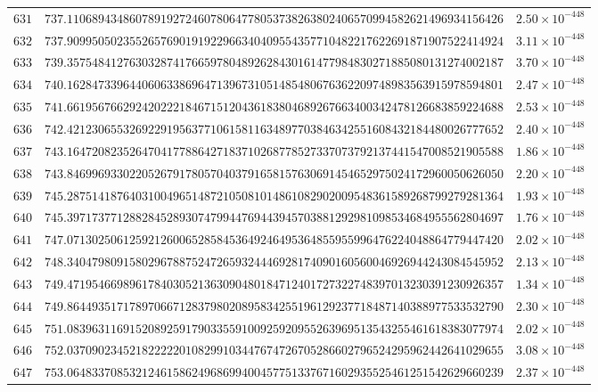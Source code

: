 \documentclass[12pt,reqno]{amsart}
\theoremstyle{remark}
\begin{document}
\begin{longtable}{clc}
$631$ & $737.1106894348607891927246078064778053738263802406570994582621496934156426$ & $2.50\times 10^{-448}$ \\
$632$ & $737.9099505023552657690191922966340409554357710482217622691871907522414924$ & $3.11\times 10^{-448}$ \\
$633$ & $739.3575484127630328741766597804892628430161477984830271885080131274002187$ & $3.70\times 10^{-448}$ \\
$634$ & $740.1628473396440606338696471396731051485480676362209748983563915978594801$ & $2.47\times 10^{-448}$ \\
$635$ & $741.6619567662924202221846715120436183804689267663400342478126683859224688$ & $2.53\times 10^{-448}$ \\
$636$ & $742.4212306553269229195637710615811634897703846342551608432184480026777652$ & $2.40\times 10^{-448}$ \\
$637$ & $743.1647208235264704177886427183710268778527337073792137441547008521905588$ & $1.86\times 10^{-448}$ \\
$638$ & $743.8469969330220526791780570403791658157630691454652975024172960050626050$ & $2.20\times 10^{-448}$ \\
$639$ & $745.2875141876403100496514872105081014861082902009548361589268799279281364$ & $1.93\times 10^{-448}$ \\
$640$ & $745.3971737712882845289307479944769443945703881292981098534684955562804697$ & $1.76\times 10^{-448}$ \\
$641$ & $747.0713025061259212600652858453649246495364855955996476224048864779447420$ & $2.02\times 10^{-448}$ \\
$642$ & $748.3404798091580296788752472659324446928174090160560046926944243084545952$ & $2.13\times 10^{-448}$ \\
$643$ & $749.4719546698961784030521363090480184712401727322748397013230391230926357$ & $1.34\times 10^{-448}$ \\
$644$ & $749.8644935171789706671283798020895834255196129237718487140388977533532790$ & $2.30\times 10^{-448}$ \\
$645$ & $751.0839631169152089259179033559100925920955263969513543255461618383077974$ & $2.02\times 10^{-448}$ \\
$646$ & $752.0370902345218222220108299103447674726705286602796524295962442641029655$ & $3.08\times 10^{-448}$ \\
$647$ & $753.0648337085321246158624968699400457751337671602935525461251542629660239$ & $2.37\times 10^{-448}$ \\

\end{longtable}
\end{document}
